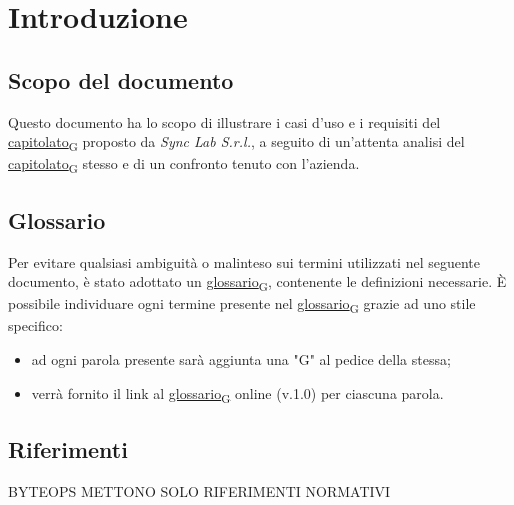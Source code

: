 \section{Introduzione}
\setcounter{subsection}{0}
\subsection{Scopo del documento}
Questo documento ha lo scopo di illustrare i casi d'uso e i requisiti del \href{https://7last.github.io/docs/rtb/documentazione-interna/glossario\#capitolato}{capitolato\textsubscript{G}} proposto da \textit{Sync Lab S.r.l.}, a seguito di un'attenta analisi del \href{https://7last.github.io/docs/rtb/documentazione-interna/glossario\#capitolato}{capitolato\textsubscript{G}} stesso e di un confronto tenuto con l'azienda.
\subsection{Glossario}
Per evitare qualsiasi ambiguità o malinteso sui termini utilizzati nel seguente documento, è stato adottato un \href{https://7last.github.io/docs/rtb/documentazione-interna/glossario\#glossario}{glossario\textsubscript{G}}, contenente le definizioni necessarie. È possibile individuare ogni termine presente nel \href{https://7last.github.io/docs/rtb/documentazione-interna/glossario\#glossario}{glossario\textsubscript{G}} grazie ad uno stile specifico:
\begin{itemize}
	\item ad ogni parola presente sarà aggiunta una "G" al pedice della stessa;
	\item verrà fornito il link al \href{https://7last.github.io/docs/rtb/documentazione-interna/glossario\#glossario}{glossario\textsubscript{G}} online (v.1.0) per ciascuna parola. %
\end{itemize}

\subsection{Riferimenti} BYTEOPS METTONO SOLO RIFERIMENTI NORMATIVI

